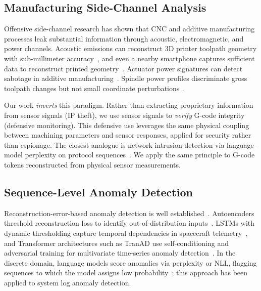 \subsection{Manufacturing Side-Channel Analysis}
\label{sec:rw_sidechannel}

Offensive side-channel research has shown that CNC and additive manufacturing processes leak substantial information through acoustic, electromagnetic, and power channels.
Acoustic emissions can reconstruct 3D printer toolpath geometry with sub-millimeter accuracy~\cite{al2016acoustic}, and even a nearby smartphone captures sufficient data to reconstruct printed geometry~\cite{hojjati2016leave}.
Actuator power signatures can detect sabotage in additive manufacturing~\cite{gatlin2019detecting}.
Spindle power profiles discriminate gross toolpath changes but not small coordinate perturbations~\cite{moore2017power}.

Our work \emph{inverts} this paradigm.
Rather than extracting proprietary information from sensor signals (IP theft), we use sensor signals to \emph{verify} G-code integrity (defensive monitoring).
This defensive use leverages the same physical coupling between machining parameters and sensor responses, applied for security rather than espionage.
The closest analogue is network intrusion detection via language-model perplexity on protocol sequences~\cite{brown2018recurrent}.
We apply the same principle to G-code tokens reconstructed from physical sensor measurements.

\subsection{Sequence-Level Anomaly Detection}
\label{sec:rw_sequence_anomaly}

Reconstruction-error-based anomaly detection is well established~\cite{chalapathy2019deep}.
Autoencoders threshold reconstruction loss to identify out-of-distribution inputs~\cite{an2015variational}.
LSTMs with dynamic thresholding capture temporal dependencies in spacecraft telemetry~\cite{hundman2018detecting}, and Transformer architectures such as TranAD use self-conditioning and adversarial training for multivariate time-series anomaly detection~\cite{tuli2022tranad}.
In the discrete domain, language models score anomalies via perplexity or NLL, flagging sequences to which the model assigns low probability~\cite{brown2018recurrent}; this approach has been applied to system log anomaly detection.


